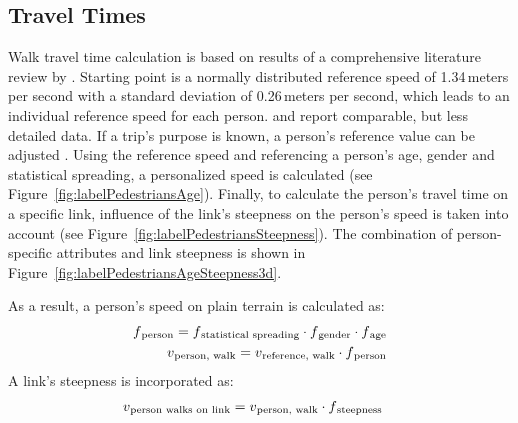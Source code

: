 \subsection{Travel Times} 
\label{sec:TravelTimes}
Walk travel time calculation is based on results of a comprehensive literature review by \citet{Weidmann_TechRep_IVT_1992}. Starting point is a normally distributed reference speed of 1.34\,meters per second with a standard deviation of 0.26\,meters per second, which leads to an individual reference speed for each person. \citet{HBS_2009} and \citet{HCM_2010} report comparable, but less detailed data. If a trip's purpose is known, a person's reference value can be adjusted \citep[commuting 1.49\,meters per second, shopping 1.16\,meters per second, leisure 1.10\,meters per second; see][]{HBS_2009}. Using the reference speed and referencing a person's age, gender and statistical spreading, a personalized speed is calculated (see Figure~\ref{fig:labelPedestriansAge}). Finally, to calculate the person's travel time on a specific link, influence of the link's steepness on the person's speed is taken into account (see Figure~\ref{fig:labelPedestriansSteepness}). The combination of person-specific attributes and link steepness is shown in Figure~\ref{fig:labelPedestriansAgeSteepness3d}.

As a result, a person's speed on plain terrain is calculated as:\begin{align}
	f\textsubscript{person} = f\textsubscript{statistical~spreading} \cdot f\textsubscript{gender} \cdot f\textsubscript{age}\\
	v\textsubscript{person, walk} = v\textsubscript{reference, walk} \cdot f\textsubscript{person}
\end{align}
A link's steepness is incorporated as:
\begin{align}
    v\textsubscript{person~walks~on~link} &= v\textsubscript{person, walk} \cdot f\textsubscript{steepness}
\end{align}

